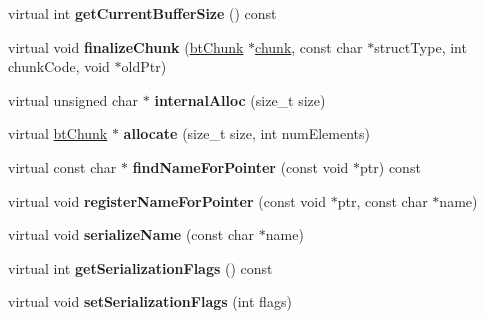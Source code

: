 \begin{DoxyCompactItemize}
\item 
\hypertarget{classbt_default_serializer_afca3aceea5872658897ecb59ba97f33f}{virtual int {\bfseries get\+Current\+Buffer\+Size} () const }\label{classbt_default_serializer_afca3aceea5872658897ecb59ba97f33f}

\item 
\hypertarget{classbt_default_serializer_a885c6fa611ad8ccb923af7a3fa7c6e93}{virtual void {\bfseries finalize\+Chunk} (\hyperlink{classbt_chunk}{bt\+Chunk} $\ast$\hyperlink{structchunk}{chunk}, const char $\ast$struct\+Type, int chunk\+Code, void $\ast$old\+Ptr)}\label{classbt_default_serializer_a885c6fa611ad8ccb923af7a3fa7c6e93}

\item 
\hypertarget{classbt_default_serializer_ac0280f12b9476be3e60e1dd9ff21d5e2}{virtual unsigned char $\ast$ {\bfseries internal\+Alloc} (size\+\_\+t size)}\label{classbt_default_serializer_ac0280f12b9476be3e60e1dd9ff21d5e2}

\item 
\hypertarget{classbt_default_serializer_a46e3eb69e93e640fe253731ca701d9bf}{virtual \hyperlink{classbt_chunk}{bt\+Chunk} $\ast$ {\bfseries allocate} (size\+\_\+t size, int num\+Elements)}\label{classbt_default_serializer_a46e3eb69e93e640fe253731ca701d9bf}

\item 
\hypertarget{classbt_default_serializer_ad396b86bb9c5b596bc0633ee64831ef1}{virtual const char $\ast$ {\bfseries find\+Name\+For\+Pointer} (const void $\ast$ptr) const }\label{classbt_default_serializer_ad396b86bb9c5b596bc0633ee64831ef1}

\item 
\hypertarget{classbt_default_serializer_a7676d536d11cca634b65bd2899cf20f2}{virtual void {\bfseries register\+Name\+For\+Pointer} (const void $\ast$ptr, const char $\ast$name)}\label{classbt_default_serializer_a7676d536d11cca634b65bd2899cf20f2}

\item 
\hypertarget{classbt_default_serializer_a481719115145d98cb9fac2abb36b53f5}{virtual void {\bfseries serialize\+Name} (const char $\ast$name)}\label{classbt_default_serializer_a481719115145d98cb9fac2abb36b53f5}

\item 
\hypertarget{classbt_default_serializer_aaef98f259c57cebd487f0db5606da14f}{virtual int {\bfseries get\+Serialization\+Flags} () const }\label{classbt_default_serializer_aaef98f259c57cebd487f0db5606da14f}

\item 
\hypertarget{classbt_default_serializer_a0efbc130ca12590028ab5e30c7e0c54d}{virtual void {\bfseries set\+Serialization\+Flags} (int flags)}\label{classbt_default_serializer_a0efbc130ca12590028ab5e30c7e0c54d}

\end{DoxyCompactItemize}

